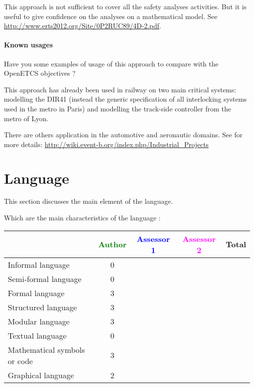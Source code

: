 \begin{author_comment}
This approach is not sufficient to cover all the safety analyses activities. But it is useful to give confidence on the analyses on a mathematical model. See \url{http://www.erts2012.org/Site/0P2RUC89/4D-2.pdf}.
\end{author_comment}


\paragraph{Known usages} Have you some examples of usage of this approach to  compare with the OpenETCS objectives ?


\begin{author_comment}
This approach has already been used in railway on two  main critical systems: modelling the DIR41 (instead the generic specification of all interlocking systems used in the metro in Paris)  and modelling the track-side controller from the metro of Lyon. 

There are others application in the automotive and aeronautic domains. See for more details: \url{http://wiki.event-b.org/index.php/Industrial_Projects}
\end{author_comment}


\section{Language}
This section discusses the main element of the language.

Which are the main characteristics of the language :

\begin{tabular}{|l | c | c | c | c|}
\hline
& \textcolor{green}{Author} & \textcolor{blue}{Assessor 1} & \textcolor{magenta}{Assessor 2} & Total \\
\hline 
Informal language & 0 & & &  \\
\hline 
Semi-formal language & 0 & & &  \\
\hline
Formal language & 3 & & &  \\
\hline
Structured language & 3 & & & \\
\hline
Modular language & 3 & & & \\
\hline
Textual language & 0 & & & \\
\hline
Mathematical symbols or code & 3 & & & \\
\hline
Graphical language & 2 & & & \\
\hline
\end{tabular}

